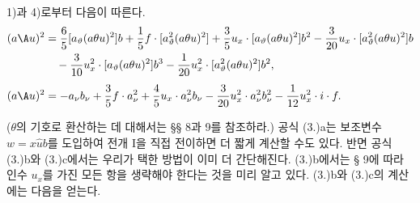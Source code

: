 
1)과 4)로부터 다음이 따른다.
\[
\begin{aligned}
(a\A u)^2
&=\frac65[a_\vartheta(a\theta u)^2]b+\frac15f\cdot[a_\vartheta^2(a\theta u)^2]+\frac35u_x\cdot[a_\vartheta(a\theta u)^2]b^2-\frac3{20}u_x\cdot[a_\vartheta^2(a\theta u)^2]b\\
&\quad-\frac3{10}u_x^2\cdot[a_\vartheta(a\theta u)^2]b^3-\frac1{20}u_x^2\cdot[a_\vartheta^2(a\theta u)^2]b^2,\\[0.4em]
(a\A u)^2&=-a_\nu b_\nu+\frac35f\cdot a_\nu^2+\frac45u_x\cdot a_\nu^2b_\nu-\frac3{20}u_x^2\cdot a_\nu^2b_\nu^2-\frac1{12}u_x^2\cdot i\cdot f.
\end{aligned}
\]

($\theta$의 기호로 환산하는 데 대해서는 §§ 8과 9를 참조하라.)
공식 (3.)a는 보조변수 $w=x\widehat{u}b$를 도입하여 전개 I을 직접 전이하면 더 짧게 계산할 수도 있다. 반면 공식 (3.)b와 (3.)c에서는 우리가 택한 방법이 이미 더 간단해진다. (3.)b에서는 § 9에 따라 인수 $u_x$를 가진 모든 항을 생략해야 한다는 것을 미리 알고 있다. (3.)b와 (3.)c의 계산에는 다음을 얻는다.
